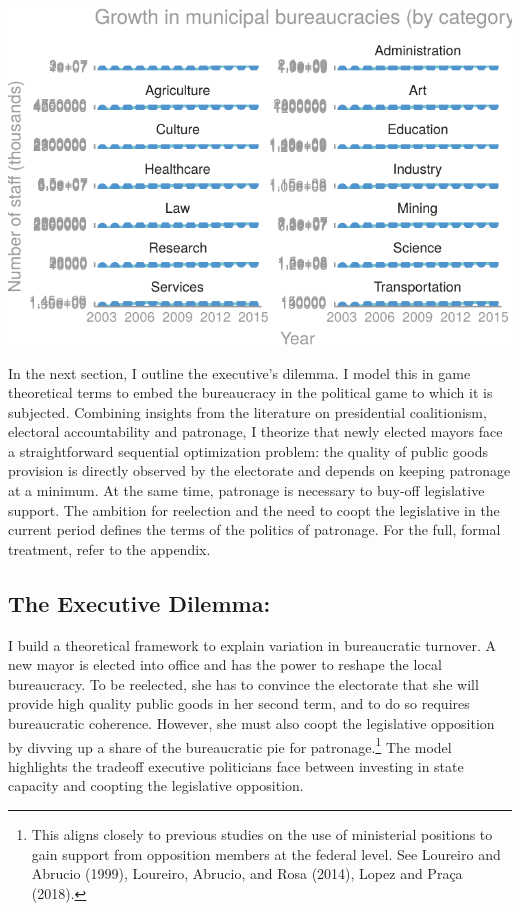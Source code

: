 \documentclass[12pt,]{article}
\let\rmarkdownfootnote\footnote%
\def\footnote{\protect\rmarkdownfootnote}
\begin{document}
\begin{center}\includegraphics{dissertation_files/figure-latex/rais time-1} \end{center}

In the next section, I outline the executive's dilemma. I model this in
game theoretical terms to embed the bureaucracy in the political game to
which it is subjected. Combining insights from the literature on
presidential coalitionism, electoral accountability and patronage, I
theorize that newly elected mayors face a straightforward sequential
optimization problem: the quality of public goods provision is directly
observed by the electorate and depends on keeping patronage at a
minimum. At the same time, patronage is necessary to buy-off legislative
support. The ambition for reelection and the need to coopt the
legislative in the current period defines the terms of the politics of
patronage. For the full, formal treatment, refer to the appendix.

\hypertarget{the-executive-dilemma}{%
\subsection{The Executive Dilemma:}\label{the-executive-dilemma}}

I build a theoretical framework to explain variation in bureaucratic
turnover. A new mayor is elected into office and has the power to
reshape the local bureaucracy. To be reelected, she has to convince the
electorate that she will provide high quality public goods in her second
term, and to do so requires bureaucratic coherence. However, she must
also coopt the legislative opposition by divving up a share of the
bureaucratic pie for patronage.\footnote{This aligns closely to previous
  studies on the use of ministerial positions to gain support from
  opposition members at the federal level. See Loureiro and Abrucio
  (1999), Loureiro, Abrucio, and Rosa (2014), Lopez and Praça (2018).}
The model highlights the tradeoff executive politicians face between
investing in state capacity and coopting the legislative opposition.
\end{document}
